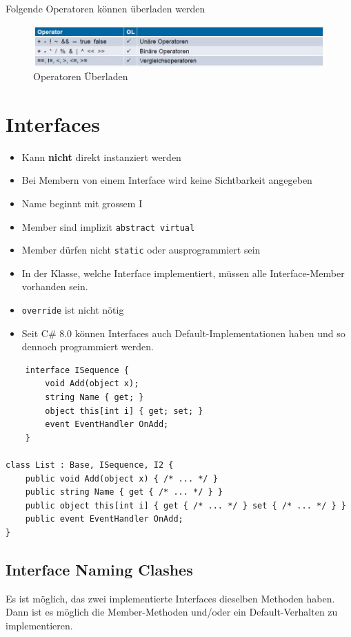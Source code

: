 \documentclass[
a4paper,
oneside,
10pt,
fleqn,
headsepline,
toc=listofnumbered, 
bibliography=totocnumbered]{scrartcl}
\let\stdsection\section
\renewcommand\section{\clearpage\stdsection}
\begin{document}
Folgende Operatoren können überladen werden
\begin{figure}[!ht]
	\centering
	\includegraphics[width=0.7\linewidth]{images/operator_overloading}
	\caption{Operatoren Überladen}
	\label{fig:operatoroverloading}
\end{figure}


\section{Interfaces}
\begin{itemize}
	\item Kann \textbf{nicht} direkt instanziert werden
	\item Bei Membern von einem Interface wird keine Sichtbarkeit angegeben
	\item Name beginnt mit grossem I
	\item Member sind implizit \lstinline[language=C]|abstract virtual|
	\item Member dürfen nicht \lstinline|static| oder ausprogrammiert sein
	\item In der Klasse, welche Interface implementiert, müssen alle Interface-Member vorhanden sein.
	\item \lstinline|override| ist nicht nötig
	\item Seit C\# 8.0 können Interfaces auch Default-Implementationen haben und so dennoch programmiert werden.
\end{itemize}
\begin{lstlisting}
	interface ISequence {
		void Add(object x);
		string Name { get; }
		object this[int i] { get; set; }
		event EventHandler OnAdd;
	}
	
class List : Base, ISequence, I2 {
	public void Add(object x) { /* ... */ }
	public string Name { get { /* ... */ } }
    public object this[int i] { get { /* ... */ } set { /* ... */ } }
    public event EventHandler OnAdd;
} 
\end{lstlisting}

\subsection{Interface Naming Clashes}
Es ist möglich, das zwei implementierte Interfaces dieselben Methoden haben. Dann ist es möglich die Member-Methoden und/oder ein Default-Verhalten zu implementieren.
\end{document}
